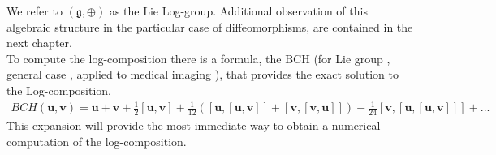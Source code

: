 \noindent
We refer to $(\mathfrak{g} , \oplus)$ as the Lie Log-group. Additional observation of this algebraic structure in the particular case of diffeomorphisms, are contained in the next chapter.\\
To compute the log-composition there is a formula, the BCH (for Lie group \cite{hall2015lie}, general case \cite{wojtynski1994one}, applied to medical imaging \cite{vercauteren08}), that provides the exact solution to the Log-composition. 
\begin{align*}
BCH(\mathbf{u},\mathbf{v}) 
= 
\mathbf{u} + \mathbf{v} + \frac{1}{2}[\mathbf{u},\mathbf{v}] + \frac{1}{12}([\mathbf{u},[\mathbf{u},\mathbf{v}]]
+ [\mathbf{v},[\mathbf{v},\mathbf{u}]]) - \frac{1}{24}[\mathbf{v},[\mathbf{u},[\mathbf{u},\mathbf{v}]]] +... 
\end{align*}
This expansion will provide the most immediate way to obtain a numerical computation of the log-composition.

